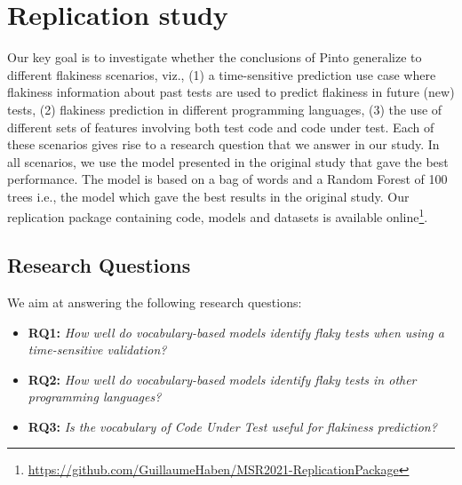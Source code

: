 \section{Replication study}
\label{sec:replication-replication}


Our key goal is to investigate whether the conclusions of Pinto \etal generalize to different flakiness scenarios, viz., (1) a time-sensitive prediction use case where flakiness information about past tests are used to predict flakiness in future (new) tests, (2) flakiness prediction in different programming languages, (3) the use of different sets of features involving both test code and code under test. Each of these scenarios gives rise to a research question that we answer in our study. In all scenarios, we use the model presented in the original study that gave the best performance. The model is based on a bag of words and a Random Forest of 100 trees i.e., the model which gave the best results in the original study. Our replication package containing code, models and datasets is available online\footnote{\url{https://github.com/GuillaumeHaben/MSR2021-ReplicationPackage}}.

\subsection{Research Questions}
We aim at answering the following research questions:
\begin{itemize}
\item \textbf{\textsc{RQ1:}} \emph{How  well  do  vocabulary-based  models  identify flaky  tests  when  using  a  time-sensitive validation?}
\item \textbf{\textsc{RQ2:} } \emph{How  well  do  vocabulary-based  models  identify flaky tests in other programming languages?}
\item \textbf{\textsc{RQ3:}} \emph{Is the vocabulary of Code Under Test useful for flakiness prediction?}
\end{itemize}



